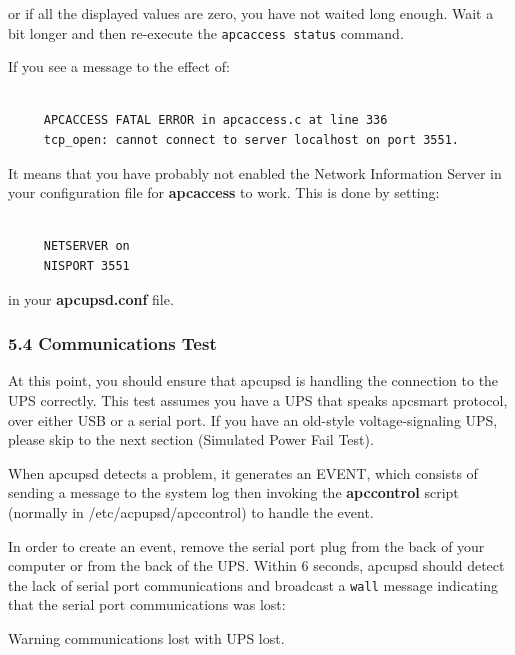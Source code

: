 or if all the displayed values are zero, you have not waited long enough. Wait
a bit longer and then re-execute the {\tt apcaccess status} command.  

If you see a message to the effect of: 

\footnotesize
\begin{verbatim}
     
     APCACCESS FATAL ERROR in apcaccess.c at line 336
     tcp_open: cannot connect to server localhost on port 3551.
\end{verbatim}
\normalsize

It means that you have probably not enabled the Network Information Server in
your configuration file for {\bf apcaccess} to work. This is done by setting: 

\footnotesize
\begin{verbatim}
     
     NETSERVER on
     NISPORT 3551
\end{verbatim}
\normalsize

in your {\bf apcupsd.conf} file. 

\label{Communications-Test}

\subsubsection*{5.4 Communications Test}

\label{index-Testing_002c-Communications-91}
\label{index-Communications-Testing-92}
At this point, you should ensure that apcupsd is handling the connection to
the UPS correctly. This test assumes you have a UPS that speaks apcsmart
protocol, over either USB or a serial port.  If you have an old-style
voltage-signaling UPS, please skip to the next section (Simulated Power Fail
Test).  

When apcupsd detects a problem, it generates an EVENT, which consists of
sending a message to the system log then invoking the {\bf apccontrol} script
(normally in /etc/acpupsd/apccontrol) to handle the event.  

In order to create an event, remove the serial port plug from the back of your
computer or from the back of the UPS. Within 6 seconds, apcupsd should detect
the lack of serial port communications and broadcast a {\tt wall} message
indicating that the serial port communications was lost:  

Warning communications lost with UPS lost.  

